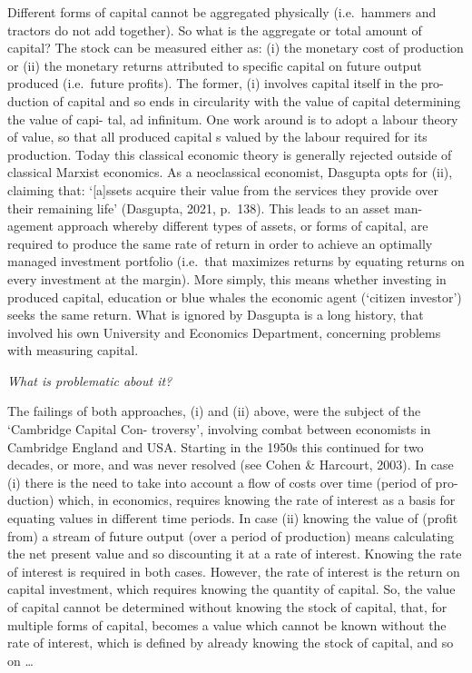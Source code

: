 \documentclass[
]{book}
\begin{document}
Different forms of capital cannot be aggregated physically (i.e.~hammers and tractors do not add
together). So what is the aggregate or total amount of capital? The stock can be measured either
as: (i) the monetary cost of production or (ii) the monetary returns attributed to specific capital
on future output produced (i.e.~future profits). The former, (i) involves capital itself in the pro-
duction of capital and so ends in circularity with the value of capital determining the value of capi-
tal, ad infinitum. One work around is to adopt a labour theory of value, so that all produced capital
s valued by the labour required for its production. Today this classical economic theory is generally
rejected outside of classical Marxist economics.
As a neoclassical economist, Dasgupta opts for (ii), claiming that: `{[}a{]}ssets acquire their value from
the services they provide over their remaining life' (Dasgupta, 2021, p.~138). This leads to an asset man-
agement approach whereby different types of assets, or forms of capital, are required to produce the
same rate of return in order to achieve an optimally managed investment portfolio (i.e.~that maximizes
returns by equating returns on every investment at the margin). More simply, this means whether
investing in produced capital, education or blue whales the economic agent (`citizen investor')
seeks the same return. What is ignored by Dasgupta is a long history, that involved his own University
and Economics Department, concerning problems with measuring capital.

\emph{What is problematic about it?}

The failings of both approaches, (i) and (ii) above, were the subject of the `Cambridge Capital Con-
troversy', involving combat between economists in Cambridge England and USA. Starting in the
1950s this continued for two decades, or more, and was never resolved (see Cohen \& Harcourt,
2003). In case (i) there is the need to take into account a flow of costs over time (period of pro-
duction) which, in economics, requires knowing the rate of interest as a basis for equating values
in different time periods. In case (ii) knowing the value of (profit from) a stream of future output
(over a period of production) means calculating the net present value and so discounting it at a rate
of interest. Knowing the rate of interest is required in both cases. However, the rate of interest is the
return on capital investment, which requires knowing the quantity of capital. So, the value of capital
cannot be determined without knowing the stock of capital, that, for multiple forms of capital,
becomes a value which cannot be known without the rate of interest, which is defined by already
knowing the stock of capital, and so on \ldots{}
\end{document}
